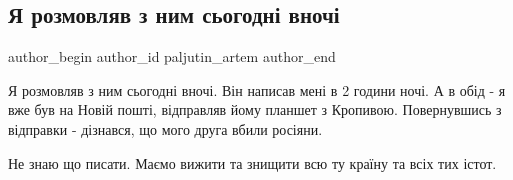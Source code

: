  
 
 
 
 

\subsection{Я розмовляв з ним сьогодні вночі}
\label{sec:08_01_2023.fb.paljutin_artem.1.ya_rozmovlyav_z_nim_}

\ifcmt
 author_begin
   author_id paljutin_artem
 author_end
\fi

Я розмовляв з ним сьогодні вночі. Він написав мені в 2 години ночі. А в обід -
я вже був на Новій пошті, відправляв йому планшет з Кропивою. Повернувшись з
відправки - дізнався, що мого друга вбили росіяни.

Не знаю що писати. Маємо вижити та знищити всю ту країну та всіх тих істот.
